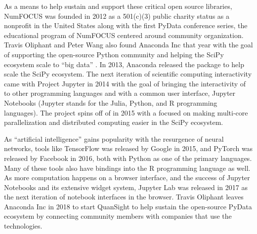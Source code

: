 \documentclass[010-intro.tex]{subfiles}
\begin{document}
        As a means to help sustain and support these critical open source libraries,
        NumFOCUS was founded in 2012 as a 501(c)(3) public charity status as a nonprofit in the United States along with the first PyData
        conference series, the educational program of NumFOCUS centered around community organization.
        Travis Oliphant and Peter Wang also found Anaconda Inc that year
        with the goal of supporting the open-source Python community and helping the SciPy ecosystem scale to ``big data''
        \cite{daskKeynotePeterWang2021}. %
        In 2013, Anaconda released the  package to help scale the SciPy ecosystem.
        The next iteration of scientific computing interactivity came with Project Jupyter in 2014
        with the goal of bringing the interactivity of  to other programming languages and with a common user interface,
        Jupyter Notebooks (Jupyter stands for the Julia, Python, and R programming languages).
        The  project spins off of  in 2015 with a focused on
        making multi-core parallelization and distributed computing easier in the SciPy ecosystem.

        As ``artificial intelligence'' gains popularity with the resurgence of neural networks,
        tools like TensorFlow was released by Google in 2015,
        and PyTorch was released by Facebook in 2016,
        both with Python as one of the primary languages.
        Many of these tools also have bindings into the R programming language as well.
        As more computation happens on a browser interface, and the success of Jupyter Notebooks and its extensive widget system,
        Jupyter Lab was released in 2017 as the next iteration of notebook interfaces in the browser.
        Travis Oliphant leaves Anaconda Inc in 2018 to start QuanSight to help sustain the open-source PyData ecosystem
        by connecting community members with companies that use the technologies.
\end{document}
